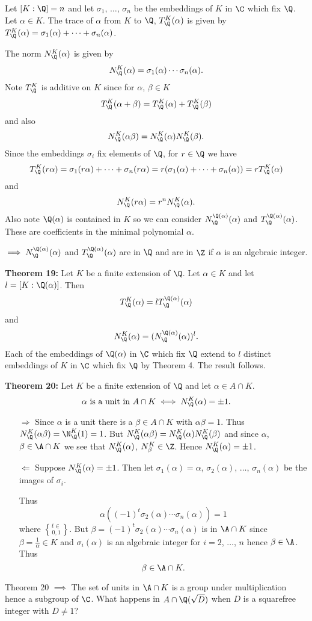 Let $[K:\Q]=n$ and let $\sigma_1$, $\dotsc$, $\sigma_n$ be the embeddings of $K$ in $\C$ which fix $\Q$.  Let $\alpha\in K$.  The trace of $\alpha$ from $K$ to $\Q$, $T_\Q^K(\alpha)$ is given by $T_\Q^K(\alpha)=\sigma_1(\alpha)+\dotsb+\sigma_n(\alpha)$.

The norm $N_\Q^K(\alpha)$ is given by
\[ N_\Q^K(\alpha) = \sigma_1(\alpha)\dotsm\sigma_n(\alpha) . \]
Note $T_\Q^K$ is additive on $K$ since for $\alpha$, $\beta\in K$
\[ T_\Q^K(\alpha+\beta) = T_\Q^K(\alpha) + T_\Q^K(\beta) \]
and also
\[ N_\Q^K(\alpha\beta) = N_\Q^K(\alpha) N_\Q^K(\beta) . \]
Since the embeddings $\sigma_i$ fix elements of $\Q$, for $r\in\Q$ we have
\[ T_\Q^K(r\alpha) = \sigma_1(r\alpha) + \dotsb + \sigma_n(r\alpha) = r(\sigma_1(\alpha)+\dotsb+\sigma_n(\alpha)) = r T_\Q^K(\alpha) \]
and
\[ N_\Q^K(r\alpha) = r^n N_\Q^K(\alpha) . \]
Also note $\Q(\alpha)$ is contained in $K$ so we can consider $N_\Q^{\Q(\alpha)}(\alpha)$ and $T_\Q^{\Q(\alpha)}(\alpha)$.  These are coefficients in the minimal polynomial $\alpha$.

$\implies N_\Q^{\Q(\alpha)}(\alpha)$ and $T_\Q^{\Q(\alpha)}(\alpha)$ are in $\Q$ and are in $\Z$ if $\alpha$ is an algebraic integer.

\textbf{Theorem 19:} Let $K$ be a finite extension of $\Q$.  Let $\alpha\in K$ and let $l=[K:\Q(\alpha)]$.  Then
\[ T_\Q^K(\alpha) = l T_\Q^{\Q(\alpha)}(\alpha) \]
and
\[ N_\Q^K(\alpha) = (N_\Q^{\Q(\alpha)}(\alpha))^l . \]
\pf Each of the embeddings of $\Q(\alpha)$ in $\C$ which fix $\Q$ extend to $l$ distinct embeddings of $K$ in $\C$ which fix $\Q$ by Theorem 4.  The result follows.

\textbf{Theorem 20:} Let $K$ be a finite extension of $\Q$ and let $\alpha\in A\cap K$.
\[ \text{$\alpha$ is a unit in $A\cap K$} \iff N_\Q^K(\alpha) = \pm 1 . \]
\pf
\begin{itemize}
\item[$\Rightarrow$] Since $\alpha$ is a unit there is a $\beta\in A\cap K$ with $\alpha\beta=1$.  Thus $N_\Q^K(\alpha\beta)=\N_\Q^K(1)=1$.  But $N_\Q^K(\alpha\beta)=N_\Q^K(\alpha)N_\Q^K(\beta)$ and since $\alpha$, $\beta\in\A\cap K$ we see that $N_\Q^K(\alpha)$, $N_\beta^K\in\Z$.  Hence $N_\Q^K(\alpha)=\pm1$.
\item[$\Leftarrow$] Suppose $N_\Q^K(\alpha)=\pm1$.  Then let $\sigma_1(\alpha)=\alpha$, $\sigma_2(\alpha)$, $\dotsc$, $\sigma_n(\alpha)$ be the images of $\sigma_i$.

Thus
\[ \alpha((-1)^t\sigma_2(\alpha)\dotsm\sigma_n(\alpha)) = 1 \]
where $t\in\brace{0,1}$.  But $\beta=(-1)^t\sigma_2(\alpha)\dotsm\sigma_n(\alpha)$ is in $\A\cap K$ since $\beta=\frac{1}{\alpha}\in K$ and $\sigma_i(\alpha)$ is an algebraic integer for $i=2$, $\dotsc$, $n$ hence $\beta\in\A$.  Thus
\[ \beta \in \A \cap K . \]
\end{itemize}
Theorem 20 $\implies$ The set of units in $\A\cap K$ is a group under multiplication hence a subgroup of $\C$.  What happens in $A\cap\Q(\sqrt{D})$ when $D$ is a squarefree integer with $D\neq1$?

